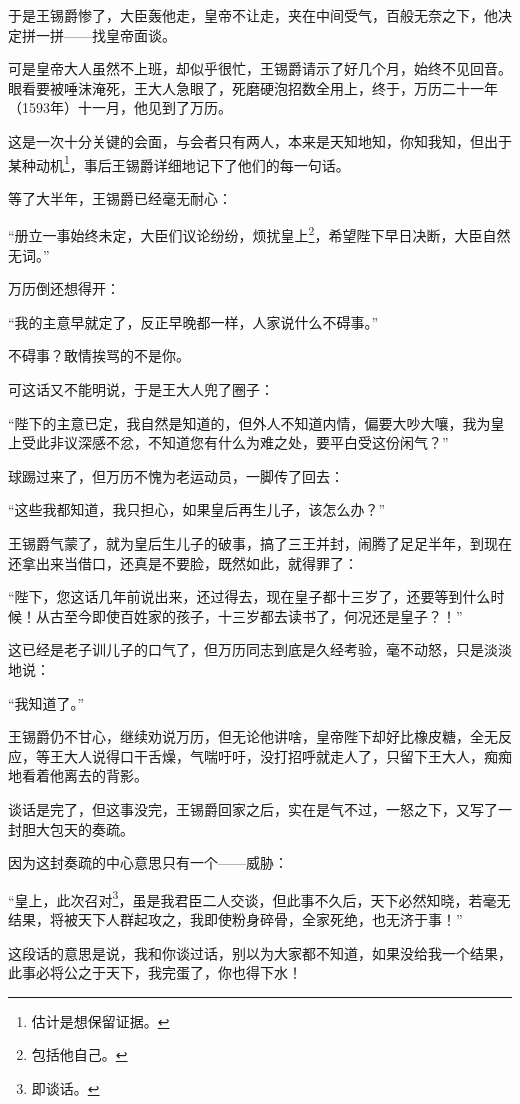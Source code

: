 \begin{multicols}{\theparacolNo}
		于是王锡爵惨了，大臣轰他走，皇帝不让走，夹在中间受气，百般无奈之下，他决定拼一拼——找皇帝面谈。

		可是皇帝大人虽然不上班，却似乎很忙，王锡爵请示了好几个月，始终不见回音。眼看要被唾沫淹死，王大人急眼了，死磨硬泡招数全用上，终于，万历二十一年（1593年）十一月，他见到了万历。

		这是一次十分关键的会面，与会者只有两人，本来是天知地知，你知我知，但出于某种动机\footnote{估计是想保留证据。}，事后王锡爵详细地记下了他们的每一句话。

		等了大半年，王锡爵已经毫无耐心：

		“册立一事始终未定，大臣们议论纷纷，烦扰皇上\footnote{包括他自己。}，希望陛下早日决断，大臣自然无词。”

		万历倒还想得开：

		“我的主意早就定了，反正早晚都一样，人家说什么不碍事。”

		不碍事？敢情挨骂的不是你。

		可这话又不能明说，于是王大人兜了圈子：

		“陛下的主意已定，我自然是知道的，但外人不知道内情，偏要大吵大嚷，我为皇上受此非议深感不忿，不知道您有什么为难之处，要平白受这份闲气？”

		球踢过来了，但万历不愧为老运动员，一脚传了回去：

		“这些我都知道，我只担心，如果皇后再生儿子，该怎么办？”

		王锡爵气蒙了，就为皇后生儿子的破事，搞了三王并封，闹腾了足足半年，到现在还拿出来当借口，还真是不要脸，既然如此，就得罪了：

		“陛下，您这话几年前说出来，还过得去，现在皇子都十三岁了，还要等到什么时候！从古至今即使百姓家的孩子，十三岁都去读书了，何况还是皇子？！”

		这已经是老子训儿子的口气了，但万历同志到底是久经考验，毫不动怒，只是淡淡地说：

		“我知道了。”

		王锡爵仍不甘心，继续劝说万历，但无论他讲啥，皇帝陛下却好比橡皮糖，全无反应，等王大人说得口干舌燥，气喘吁吁，没打招呼就走人了，只留下王大人，痴痴地看着他离去的背影。

		谈话是完了，但这事没完，王锡爵回家之后，实在是气不过，一怒之下，又写了一封胆大包天的奏疏。

		因为这封奏疏的中心意思只有一个——威胁：

		“皇上，此次召对\footnote{即谈话。}，虽是我君臣二人交谈，但此事不久后，天下必然知晓，若毫无结果，将被天下人群起攻之，我即使粉身碎骨，全家死绝，也无济于事！”

		这段话的意思是说，我和你谈过话，别以为大家都不知道，如果没给我一个结果，此事必将公之于天下，我完蛋了，你也得下水！


\end{multicols}
